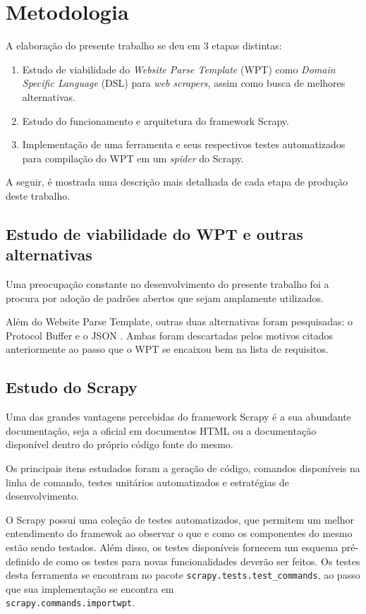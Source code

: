 \chapter{Metodologia}
\thispagestyle{fancy}

A elaboração do presente trabalho se deu em 3 etapas distintas:

\begin{enumerate}
	\item Estudo de viabilidade do \emph{Website Parse Template} (WPT) como \emph{Domain Specific Language} (DSL) para \emph{web scrapers}, assim como busca de melhores alternativas.
	\item Estudo do funcionamento e arquitetura do framework Scrapy.
	\item Implementação de uma ferramenta e seus respectivos testes automatizados para compilação do WPT em um \emph{spider} do Scrapy.
\end{enumerate}

A seguir, é mostrada uma descrição mais detalhada de cada etapa de produção deste trabalho.

\section{Estudo de viabilidade do WPT e outras alternativas}

Uma preocupação constante no desenvolvimento do presente trabalho foi a procura por adoção de padrões abertos que sejam amplamente utilizados.

Além do Website Parse Template, outras duas alternativas foram pesquisadas: o Protocol Buffer \cite{protobuf} e o JSON \cite{JSON}. Ambas foram descartadas pelos motivos citados anteriormente ao passo que o WPT se encaixou bem na lista de requisitos.

\section{Estudo do Scrapy}

Uma das grandes vantagens percebidas do framework Scrapy é a sua abundante documentação, seja a oficial em documentos HTML ou a documentação disponível dentro do próprio código fonte do mesmo.

Os principais itens estudados foram a geração de código, comandos disponíveis na linha de comando, testes unitários automatizados e estratégias de desenvolvimento.

O Scrapy possui uma coleção de testes automatizados, que permitem um melhor entendimento do framewok ao observar o que e como os componentes do mesmo estão sendo testados. Além disso, os testes disponíveis fornecem um esquema pré-definido de como os testes para novas funcionalidades deverão ser feitos. Os testes desta ferramenta se encontram no pacote \texttt{scrapy.tests.test\_commands}, ao passo que sua implementação se encontra em \\
 \texttt{scrapy.commands.importwpt}.

